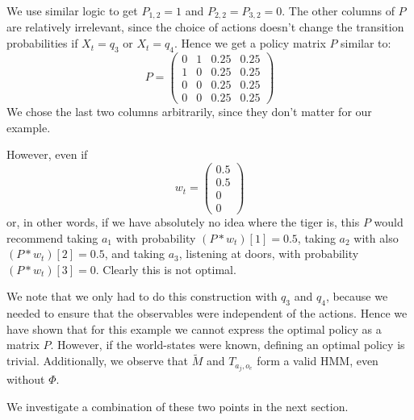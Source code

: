 \documentclass{article}
\theoremstyle{definition}
\begin{document}
We use similar logic to get $P_{1,2}=1$ and $P_{2,2}=P_{3,2}=0$. The other columns of $P$ are relatively irrelevant, since the choice of actions doesn't change the transition probabilities if $X_t=q_3$ or $X_t=q_4$. 
Hence we get a policy matrix $P$ similar to:
\[
P=
\left ( \begin{matrix}
0 & 1 & 0.25 & 0.25 \\
1 & 0 & 0.25 & 0.25 \\
0 & 0 & 0.25 & 0.25 \\
0 & 0 & 0.25 & 0.25 
\end{matrix}
\right ) 
\]
We chose the last two columns arbitrarily, since they don't matter for our example. 

However, even if
\[
w_t=
\left (
\begin{matrix}
0.5 \\
0.5 \\
0 \\ 0
\end{matrix}
\right )
\]
or, in other words, if we have absolutely no idea where the tiger is, this $P$ would recommend taking $a_1$ with probability $(P*w_t)[1]=0.5$, taking $a_2$ with also $(P*w_t)[2]=0.5$, and taking $a_3$, listening at doors, with probability $(P*w_t)[3]=0$. Clearly this is not optimal. 

We note that we only had to do this construction with $q_3$ and $q_4$, because we needed to ensure that the observables were independent of the actions. 
Hence we have shown that for this example we cannot express the optimal policy as a matrix $P$. However, if the world-states were known, defining an optimal policy is trivial. 
Additionally, we observe that $\widetilde{M}$ and $T_{a_j,o_e}$ form a valid HMM, even without $\Phi$. 

We investigate a combination of these two points in the next section.
\end{document}
